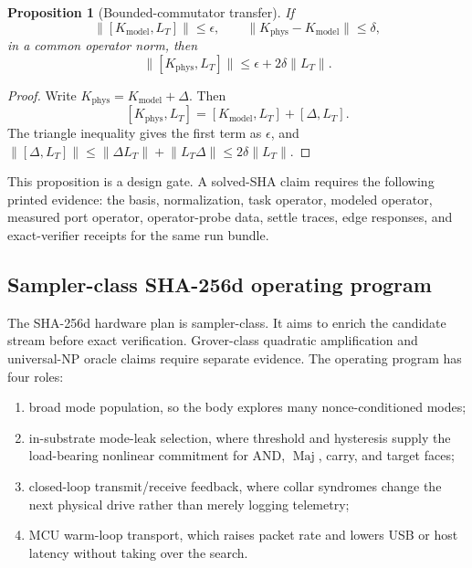 \documentclass[11pt]{article}
\newtheorem{proposition}[theorem]{Proposition}
\theoremstyle{definition}
\theoremstyle{remark}
\newcommand{\Maj}{\operatorname{Maj}}
\begin{document}
\begin{proposition}[Bounded-commutator transfer]
\label{prop:commutatortransfer}
If
\[
\lVert [K_{\mathrm{model}},L_T]\rVert\le \epsilon,\qquad
\lVert K_{\mathrm{phys}}-K_{\mathrm{model}}\rVert\le \delta,
\]
in a common operator norm, then
\[
\lVert [K_{\mathrm{phys}},L_T]\rVert
\le
\epsilon+2\delta\lVert L_T\rVert .
\]
\end{proposition}

\begin{proof}
Write \(K_{\mathrm{phys}}=K_{\mathrm{model}}+\Delta\). Then
\[
[K_{\mathrm{phys}},L_T]=[K_{\mathrm{model}},L_T]+[\Delta,L_T].
\]
The triangle inequality gives the first term as \(\epsilon\), and
\(\lVert[\Delta,L_T]\rVert\le
\lVert\Delta L_T\rVert+\lVert L_T\Delta\rVert
\le 2\delta\lVert L_T\rVert\).
\end{proof}

This proposition is a design gate. A solved-SHA claim requires the following
printed evidence: the
basis, normalization, task operator, modeled operator, measured port operator,
operator-probe data, settle traces, edge responses, and exact-verifier
receipts for the same run bundle.

\subsection{Sampler-class SHA-256d operating program}

The SHA-256d hardware plan is sampler-class. It aims to enrich the candidate
stream before exact verification. Grover-class quadratic amplification and
universal-NP oracle claims require separate evidence. The operating program has
four roles:

\begin{enumerate}
\item broad mode population, so the body explores many nonce-conditioned modes;
\item in-substrate mode-leak selection, where threshold and hysteresis supply
the load-bearing nonlinear commitment for AND, \(\Maj\), carry, and target
faces;
\item closed-loop transmit/receive feedback, where collar syndromes change the
next physical drive rather than merely logging telemetry;
\item MCU warm-loop transport, which raises packet rate and lowers USB or host
latency without taking over the search.
\end{enumerate}
\end{document}
